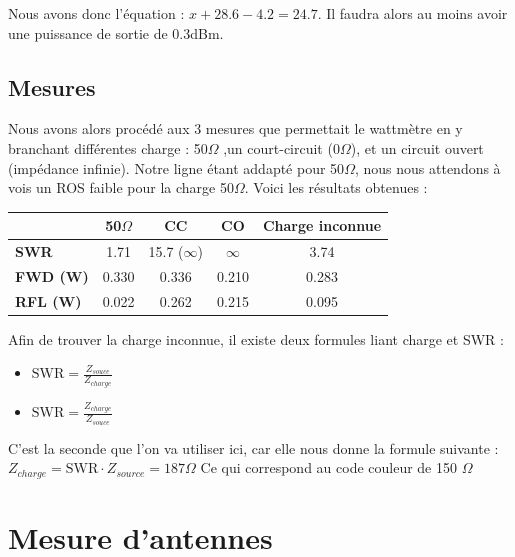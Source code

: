 \documentclass[a4paper,12pt]{report}            %
\begin{document}
Nous avons donc l'équation : $x+28.6-4.2=24.7$. Il faudra alors au moins avoir une puissance de sortie de 0.3dBm.

\section{Mesures}

Nous avons alors procédé aux 3 mesures que permettait le wattmètre en y branchant différentes charge : 50$\Omega$ ,un court-circuit (0$\Omega$), et un circuit ouvert (impédance infinie).
Notre ligne étant addapté pour 50$\Omega$, nous nous attendons à vois un ROS faible pour la charge 50$\Omega$. Voici les 
résultats obtenues :

\begin{center}
	\begin{tabular}{||p{4cm}||*{4}{c|}|}
		\hline
		\bfseries         & 50$\Omega$ & CC              & CO       & Charge inconnue \\
		\hline
		\hline
		\bfseries SWR     & 1.71       & 15.7 ($\infty$) & $\infty$ & 3.74            \\
		\hline
		\bfseries FWD (W) & 0.330      & 0.336           & 0.210    & 0.283           \\
		\hline
		\bfseries RFL (W) & 0.022      & 0.262           & 0.215    & 0.095           \\
		\hline
		\hline
	\end{tabular}
\end{center}

Afin de trouver la charge inconnue, il existe deux formules liant charge et SWR :
\begin{itemize}
	\item $\mbox{SWR} = \frac{Z_{souce}}{Z_{charge}}$
	\item $\mbox{SWR} = \frac{Z_{charge}}{Z_{souce}}$
\end{itemize}

C'est la seconde que l'on va utiliser ici, car elle nous donne la formule suivante : 
$Z_{charge} = \mbox{SWR} \cdot Z_{source} = 187\Omega$
Ce qui correspond au code couleur de 150 $\Omega$


\chapter{Mesure d'antennes}
\end{document}
